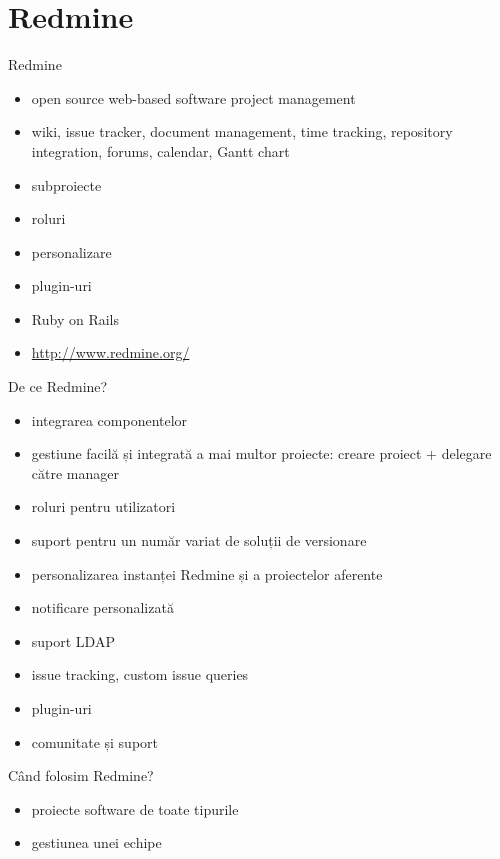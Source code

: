 \documentclass{beamer}
\begin{document}
\section{Redmine}

\begin{frame}{Redmine}
  \begin{itemize}
    \item open source web-based software project management
    \item wiki, issue tracker, document management, time tracking, repository
    integration, forums, calendar, Gantt chart
    \item subproiecte
    \item roluri
    \item personalizare
    \item plugin-uri
    \item Ruby on Rails
    \item \url{http://www.redmine.org/}
  \end{itemize}
\end{frame}

\begin{frame}{De ce Redmine?}
  \begin{itemize}
    \item integrarea componentelor
    \item gestiune facilă și integrată a mai multor proiecte: creare proiect +
    delegare către manager
    \item roluri pentru utilizatori
    \item suport pentru un număr variat de soluții de versionare
    \item personalizarea instanței Redmine și a proiectelor aferente
    \item notificare personalizată
    \item suport LDAP
    \item issue tracking, custom issue queries
    \item plugin-uri
    \item comunitate și suport
  \end{itemize}
\end{frame}

\begin{frame}{Când folosim Redmine?}
  \begin{itemize}
    \item proiecte software de toate tipurile
    \item gestiunea unei echipe
  \end{itemize}
\end{frame}
\end{document}
